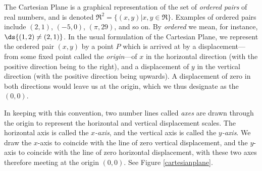 The Cartesian Plane is a graphical representation of the set
of {\it ordered pairs} of real numbers, and is denoted
$\Re^2=\{(x,y)| x,y\in\Re\}$. Examples of ordered pairs include 
$(2,1)$, $(-5,0)$, $(\pi,29)$, and so on.  By {\it ordered}
we mean, for instance, $\ds{(1,2)\ne(2,1)}$. 
In the usual formulation of the Cartesian Plane, we represent
the ordered pair $(x,y)$ by a point $P$ which is arrived at
by a displacement---from some fixed point
called the {\it origin}---of $x$ in the horizontal direction (with 
the positive direction being to the right), and 
a displacement of $y$ in the vertical direction (with the
positive direction being upwards).  A displacement of zero in
both directions would leave us at the origin, which we 
thus designate as the $(0,0)$. 
 

In keeping with this convention, two number lines called
{\it axes}  are drawn through
the origin to represent 
the horizontal and vertical displacement scales.  The horizontal
axis is called the {\it $x$-axis}, and the vertical axis is
called the {\it $y$-axis}.  We draw the $x$-axis to coincide
with the line of zero vertical displacement, and the $y$-axis
to coincide with the line of zero horizontal displacement, with
these two axes therefore meeting at the origin $(0,0)$.
See Figure \ref{cartesianplane}. 
 

